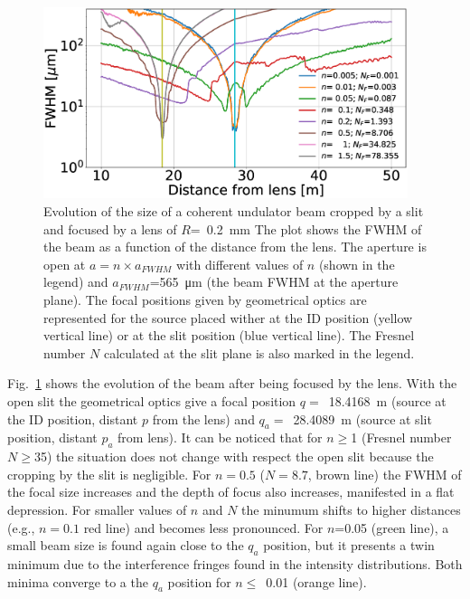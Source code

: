 \documentclass{iucr}              %
\begin{document}
\begin{figure}\label{fig:oneTFund}
    \centering
    \includegraphics[width=0.95\textwidth]{figures/oneTF_UndSource_RectSlit_R200um.eps}

    \caption{Evolution of the size of a coherent undulator beam cropped by a slit and focused by a lens of $R$=~\SI{0.2}{\milli\meter} 
    The plot shows the FWHM of the beam  as a function of the distance from the lens. The aperture is open at $a = n \times a_{FWHM}$ with different values of $n$ (shown in the legend) and $a_{FWHM}$=\SI{565}{\micro\meter} (the beam FWHM at the aperture plane). The focal positions given by geometrical optics are represented for the source placed wither at the ID position (yellow vertical line) or at the slit position (blue vertical line).
    The Fresnel number $N$ calculated at the slit plane is also marked in the legend.
    }
\end{figure}

Fig.~\ref{fig:oneTFund} shows the evolution of the beam after being focused by the lens. With the open slit the geometrical optics give a focal position $q=$~\SI{18.4168}{\meter} (source at the ID position, distant $p$ from the lens) and $q_a=$~\SI{28.4089}{\meter} (source at slit position, distant $p_a$ from lens). It can be noticed that for $n\ge$1 (Fresnel number $N\ge$35) the situation does not change with respect the open slit because the cropping by the slit is negligible. For $n=0.5$ ($N=8.7$, brown line) the FWHM of the focal size increases and the depth of focus also increases, manifested in a flat depression. For smaller values of $n$ and $N$ the minumum shifts to higher distances (e.g., $n=0.1$ red line) and becomes less pronounced. For $n$=0.05 (green line), a small beam size is found again close to the $q_a$ position, but it presents a twin minimum due to the interference fringes found in the intensity distributions. Both minima converge to a the $q_a$ position for $n\le$~0.01 (orange line). 
\end{document}
